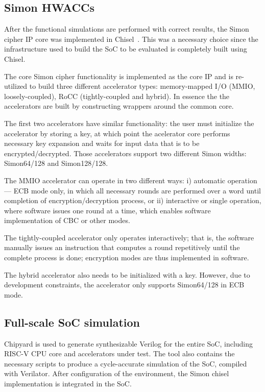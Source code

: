 \documentclass[10pt,conference]{IEEEtran}
\begin{document}
\subsection{Simon HWACCs}

After the functional simulations are performed with correct results, the Simon
cipher IP core was implemented in Chisel~\cite{chisel}. This was a necessary
choice since the infrastructure used to build the SoC to be evaluated is
completely built using Chisel.

The core Simon cipher functionality is implemented as the core IP and is
re-utilized to build three different accelerator types: memory-mapped I/O
(MMIO, loosely-coupled), RoCC (tightly-coupled and hybrid). In essence the the
accelerators are built by constructing wrappers around the common core.

The first two accelerators have similar functionality: the user must initialize the
accelerator by storing a key, at which point the acelerator core performs
necessary key expansion and waits for input data that is to be
encrypted/decrypted. Those accelerators support two different Simon widths:
Simon64/128 and Simon128/128.

The MMIO accelerator can operate in two different ways: i) automatic
operation --- ECB mode only, in which all necessary rounds are performed over a word until
completion of encryption/decryption process, or ii) interactive or single operation, where
software issues one round at a time, which enables software implementation of
CBC or other modes.

The tightly-coupled accelerator only operates interactively; that is, the
software manually issues an instruction that computes a round repetitively
until the complete process is done; encryption modes are thus
implemented in software.

The hybrid accelerator also needs to be initialized with a key. However, due to
development constraints, the accelerator only supports Simon64/128 in ECB mode.


\subsection{Full-scale SoC simulation}

Chipyard is used to generate synthesizable Verilog for the
entire SoC, including RISC-V CPU core and accelerators under test. The tool also
contains the necessary scripts to produce a cycle-accurate simulation of the
SoC, compiled with Verilator. After configuration of the environment, the Simon
chisel implementation is integrated in the SoC.
\end{document}
